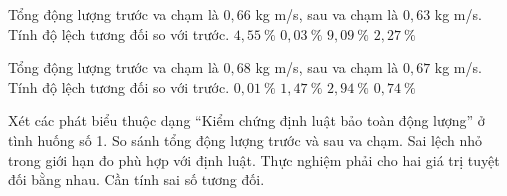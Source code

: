 \begin{ex}
Tổng động lượng trước va chạm là $0,66$ kg m/s, sau va chạm là $0,63$ kg m/s. Tính độ lệch tương đối so với trước.
\choice
{\True $4,55\ \mathrm{\%}$}
{$0,03\ \mathrm{\%}$}
{$9,09\ \mathrm{\%}$}
{$2,27\ \mathrm{\%}$}
\end{ex}

\begin{ex}
Tổng động lượng trước va chạm là $0,68$ kg m/s, sau va chạm là $0,67$ kg m/s. Tính độ lệch tương đối so với trước.
\choice
{$0,01\ \mathrm{\%}$}
{\True $1,47\ \mathrm{\%}$}
{$2,94\ \mathrm{\%}$}
{$0,74\ \mathrm{\%}$}
\end{ex}

\begin{ex}
Xét các phát biểu thuộc dạng “Kiểm chứng định luật bảo toàn động lượng” ở tình huống số 1.
\choiceTF
{\True So sánh tổng động lượng trước và sau va chạm.}
{\True Sai lệch nhỏ trong giới hạn đo phù hợp với định luật.}
{Thực nghiệm phải cho hai giá trị tuyệt đối bằng nhau.}
{\True Cần tính sai số tương đối.}
\end{ex}


